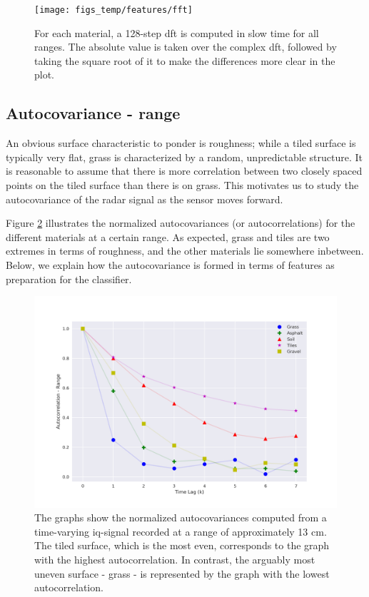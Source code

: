 \begin{figure}[h]
	\centering
	\texttt{[image: figs\_temp/features/fft]}
	\caption{For each material, a 128-step \gls{dft} is computed in slow time for all ranges. The absolute value is taken over the complex \gls{dft}, followed by taking the square root of it to make the differences more clear in the plot. }
	\label{fig:fft}
\end{figure}


\subsection{Autocovariance - range}
\label{ACr}
An obvious surface characteristic to ponder is roughness; while a tiled surface is typically very flat, grass is characterized by a random, unpredictable structure. It is reasonable to assume that there is more correlation between two closely spaced points on the tiled surface than there is on grass. This motivates us to study the autocovariance of the radar signal as the sensor moves forward.

Figure \ref{fig:autocorr_range} illustrates the normalized autocovariances (or autocorrelations) for the different materials at a certain range. As expected, grass and tiles are two extremes in terms of roughness, and the other materials lie somewhere inbetween. Below, we explain how the autocovariance is formed in terms of features as preparation for the classifier.

\begin{figure}[h]
	\centering
	\includegraphics[scale=0.45]{figs_temp/features/autocorr_range.png}
	\caption{The graphs show the normalized autocovariances computed from a time-varying \gls{iq}-signal recorded at a range of approximately 13 cm. The tiled surface, which is the most even, corresponds to the graph with the highest autocorrelation. In contrast, the arguably most uneven surface - grass - is represented by the graph with the lowest autocorrelation.}
	\label{fig:autocorr_range}
\end{figure}

